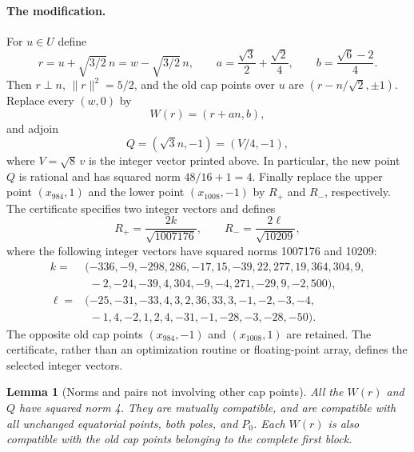 \documentclass[11pt]{article}
\newtheorem{lemma}{Lemma}
\begin{document}
\paragraph{The modification.}
For $u\in U$ define
\[
r=u+\sqrt{3/2}\,n=w-\sqrt{3/2}\,n,\qquad
a=\frac{\sqrt3}{2}+\frac{\sqrt2}{4},\qquad
b=\frac{\sqrt6-2}{4}.
\]
Then $r\perp n$, $\|r\|^2=5/2$, and the old cap points over $u$ are
$(r-n/\sqrt2,\pm1)$. Replace every $(w,0)$ by
\[
 W(r)=(r+a n,b),
\]
and adjoin
\[
 Q=(\sqrt3 n,-1)=(V/4,-1),
\]
where $V=\sqrt8\,v$ is the integer vector printed above. In particular,
the new point $Q$ is rational and has squared norm $48/16+1=4$.
Finally replace the upper point $(x_{984},1)$ and the lower point
$(x_{1008},-1)$ by $R_+$ and $R_-$, respectively. The certificate specifies
two integer vectors and defines
\[
 R_+=\frac{2k}{\sqrt{1007176}},\qquad
 R_-=\frac{2\ell}{\sqrt{10209}},
\]
where the following integer vectors have squared norms 1007176 and 10209:
\begin{align*}
k={}&(-336,-9,-298,286,-17,15,-39,22,277,19,364,304,9,\!\\
 &\phantom{(}-2,-24,-39,4,304,-9,-4,271,-29,9,-2,500),\\
\ell={}&(-25,-31,-33,4,3,2,36,33,3,-1,-2,-3,-4,\!\\
 &\phantom{(}-1,4,-2,1,2,4,-31,-1,-28,-3,-28,-50).
\end{align*}
The opposite old cap points $(x_{984},-1)$ and $(x_{1008},1)$ are retained.
The certificate, rather than an optimization routine or floating-point
array, defines the selected integer vectors.

\begin{lemma}[Norms and pairs not involving other cap points]
All the $W(r)$ and $Q$ have squared norm 4. They are mutually compatible,
and are compatible with all unchanged equatorial points, both poles, and
$P_0$. Each $W(r)$ is also compatible with the old cap points belonging
to the complete first block.
\end{lemma}
\end{document}
